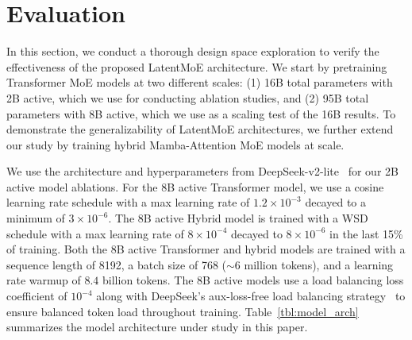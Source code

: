 \section{Evaluation}
\label{sec:results}
In this section, we conduct a thorough design space exploration to verify the effectiveness of the proposed LatentMoE architecture. We start by pretraining Transformer MoE models at two different scales: (1) 16B total parameters with 2B active, which we use for conducting ablation studies, and (2) 95B total parameters with 8B active, which we use as a scaling test of the 16B results. To demonstrate the generalizability of LatentMoE architectures, we further extend our study by training hybrid Mamba-Attention MoE models at scale. 

We use the architecture and hyperparameters from DeepSeek-v2-lite~\citep{deepseek_v2} for our 2B active model ablations. For the 8B active Transformer model, we use a cosine learning rate schedule with a max learning rate of $1.2 \times 10^{-3}$ decayed to a minimum of $3 \times 10^{-6}$. The 8B active Hybrid model is trained with a WSD schedule with a max learning rate of $8 \times 10^{-4}$ decayed to $8 \times 10^{-6}$ in the last 15\% of training.  Both the 8B active Transformer and hybrid models are trained with a sequence length of 8192, a batch size of 768 ($\sim6$ million tokens), and a learning rate warmup of $8.4$ billion tokens. The 8B active models use a load balancing loss coefficient of $10^{-4}$ along with DeepSeek’s aux-loss-free load balancing strategy~\citep{auxiliarylossfreeloadbalancingstrategy} to ensure balanced token load throughout training. Table~\ref{tbl:model_arch} summarizes the model architecture under study in this paper. 

